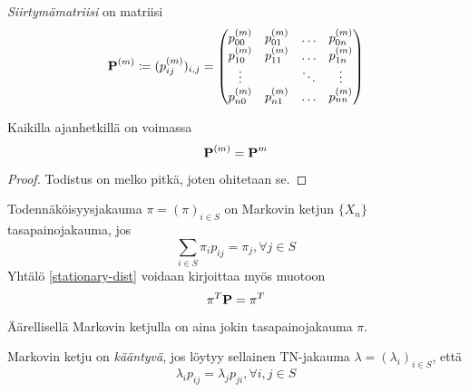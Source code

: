 \begin{maar}
	\textit{Siirtymämatriisi} on matriisi
	\begin{equation}
		\textbf{P} ^{(m)} \coloneqq (p_{ij}^{(m)})_{i,j} =
		\begin{pmatrix}
			p_{00}^{(m)} & p_{01}^{(m)} & \dots & p_{0n}^{(m)} \\
			p_{10}^{(m)} & p_{11}^{(m)} & \dots & p_{1n}^{(m)} \\
			\vdots & & \ddots & \vdots \\
			p_{n0}^{(m)} & p_{n1}^{(m)} & \dots & p_{nn}^{(m)}
		\end{pmatrix}
	\end{equation}
\end{maar}

\begin{lause}
	Kaikilla ajanhetkillä on voimassa
	\begin{equation}
		\textbf{P} ^{(m)} = \textbf{P} ^m
	\end{equation}
\end{lause}
\begin{proof}
	Todistus on melko pitkä, joten ohitetaan se.
\end{proof}

\begin{maar}
	Todennäköisyysjakauma $\pi=(\pi)_{i\in S}$ on Markovin ketjun $\{X_n\}$ tasapainojakauma, jos 
	\begin{equation}\label{stationary-dist}
		\sum_{i\in S} \pi_i p_{ij}=\pi_j, \forall j\in S
	\end{equation}
	Yhtälö \ref{stationary-dist} voidaan kirjoittaa myös muotoon 
	\begin{equation}\label{stationary-dist2}
		\pi^T\textbf{P}= \pi^T
	\end{equation}
\end{maar}

\begin{lause}
	Äärellisellä Markovin ketjulla on aina jokin tasapainojakauma $\pi$.
\end{lause}

\begin{maar}\label{kaant-disk}
	Markovin ketju on \textit{kääntyvä}, jos löytyy sellainen TN-jakauma $\lambda=(\lambda_i)_{i\in S}$, että 
	\begin{equation}
		\lambda_ip_{ij}= \lambda_jp_{ji},\forall i,j\in S
	\end{equation}
\end{maar}

